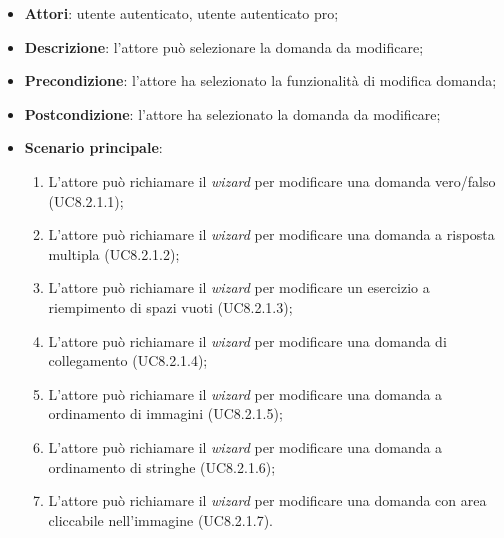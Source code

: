 		\begin{itemize}
			\item \textbf{Attori}: utente autenticato, utente autenticato pro;
			\item \textbf{Descrizione}: l'attore può selezionare la domanda da modificare;
			\item \textbf{Precondizione}: l'attore ha selezionato la funzionalità di modifica domanda;
			\item \textbf{Postcondizione}: l'attore ha selezionato la domanda da modificare; 
			\item \textbf{Scenario principale}: 
					\begin{enumerate}
					\item
					L'attore può richiamare il \textit{wizard} per modificare una domanda vero/falso (UC8.2.1.1);
					\item
					L'attore può richiamare il \textit{wizard} per modificare una domanda a risposta multipla (UC8.2.1.2);
					\item
					L'attore può richiamare il \textit{wizard} per modificare un esercizio a riempimento di spazi vuoti (UC8.2.1.3);
					\item
					L'attore può richiamare il \textit{wizard} per modificare una domanda di collegamento (UC8.2.1.4);
					\item
					L'attore può richiamare il \textit{wizard} per modificare una domanda a ordinamento di immagini (UC8.2.1.5);
					\item
					L'attore può richiamare il \textit{wizard} per modificare una domanda a ordinamento di stringhe (UC8.2.1.6);
					\item
					L'attore può richiamare il \textit{wizard} per modificare una domanda con area cliccabile nell'immagine (UC8.2.1.7).
	 			\end{enumerate}
			
		\end{itemize}










